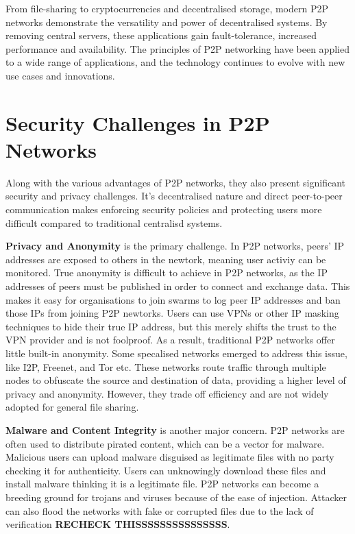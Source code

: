 \documentclass[12pt,a4paper]{report}
\begin{document}
From file-sharing to cryptocurrencies and decentralised storage, modern P2P networks demonstrate the versatility and power of decentralised systems. By removing central servers, these applications gain fault-tolerance, increased performance and availability. The principles of P2P networking have been applied to a wide range of applications, and the technology continues to evolve with new use cases and innovations.

\section{Security Challenges in P2P Networks}
Along with the various advantages of P2P networks, they also present significant security and privacy challenges. It's decentralised nature and direct peer-to-peer communication makes enforcing security policies and protecting users more difficult compared to traditional centralisd systems.

\textbf{Privacy and Anonymity} is the primary challenge. In P2P networks, peers' IP addresses are exposed to others in the newtork, meaning user activiy can be monitored. True anonymity is difficult to achieve in P2P networks, as the IP addresses of peers must be published in order to connect and exchange data. This makes it easy for organisations to join swarms to log peer IP addresses and ban those IPs from joining P2P newtorks. Users can use VPNs or other IP masking techniques to hide their true IP address, but this merely shifts the trust to the VPN provider and is not foolproof. As a result, traditional P2P networks offer little built-in anonymity. Some specalised networks emerged to address this issue, like I2P, Freenet, and Tor etc. These networks route traffic through multiple nodes to obfuscate the source and destination of data, providing a higher level of privacy and anonymity. However, they trade off efficiency and are not widely adopted for general file sharing.

\textbf{Malware and Content Integrity} is another major concern. P2P networks are often used to distribute pirated content, which can be a vector for malware. Malicious users can upload malware disguised as legitimate files with no party checking it for authenticity. Users can unknowingly download these files and install malware thinking it is a legitimate file. P2P networks can become a breeding ground for trojans and viruses because of the ease of injection. Attacker can also flood the networks with fake or corrupted files due to the lack of verification \cite{security} \textbf{RECHECK THISSSSSSSSSSSSSSS}.
\end{document}
